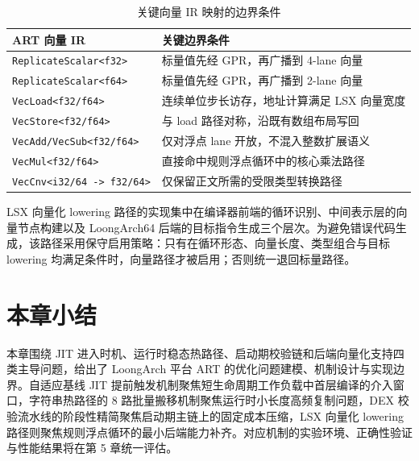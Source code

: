 \begin{table}[htbp]
    \centering
    \small
    \caption{关键向量 IR 映射的边界条件}
    \label{tab:ir-to-lsx-boundary}
    \begin{tabular}{p{4.4cm}p{6.2cm}}
        \toprule
        \textbf{ART 向量 IR} & \textbf{关键边界条件} \\
        \midrule
        \texttt{ReplicateScalar<f32>} & 标量值先经 GPR，再广播到 4-lane 向量 \\
        \texttt{ReplicateScalar<f64>} & 标量值先经 GPR，再广播到 2-lane 向量 \\
        \texttt{VecLoad<f32/f64>} & 连续单位步长访存，地址计算满足 LSX 向量宽度 \\
        \texttt{VecStore<f32/f64>} & 与 load 路径对称，沿既有数组布局写回 \\
        \texttt{VecAdd/VecSub<f32/f64>} & 仅对浮点 lane 开放，不混入整数扩展语义 \\
        \texttt{VecMul<f32/f64>} & 直接命中规则浮点循环中的核心乘法路径 \\
        \texttt{VecCnv<i32/64 -> f32/64>} & 仅保留正文所需的受限类型转换路径 \\
        \bottomrule
    \end{tabular}
\end{table}

LSX 向量化 lowering 路径的实现集中在编译器前端的循环识别、中间表示层的向量节点构建以及 LoongArch64 后端的目标指令生成三个层次。为避免错误代码生成，该路径采用保守启用策略：只有在循环形态、向量长度、类型组合与目标 lowering 均满足条件时，向量路径才被启用；否则统一退回标量路径。

\section{本章小结}

本章围绕 JIT 进入时机、运行时稳态热路径、启动期校验链和后端向量化支持四类主导问题，给出了 LoongArch 平台 ART 的优化问题建模、机制设计与实现边界。自适应基线 JIT 提前触发机制聚焦短生命周期工作负载中首层编译的介入窗口，字符串热路径的 8 路批量搬移机制聚焦运行时小长度高频复制问题，DEX 校验流水线的阶段性精简聚焦启动期主链上的固定成本压缩，LSX 向量化 lowering 路径则聚焦规则浮点循环的最小后端能力补齐。对应机制的实验环境、正确性验证与性能结果将在第 5 章统一评估。
